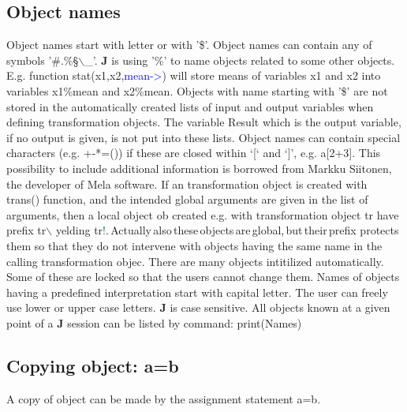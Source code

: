 \subsection{Object names}
\label{onames}
Object names start with letter or with '\$'. Object names can contain any of
symbols '\#.\%§$\backslash$\_'. \textbf{J} is using '\%' to name objects related to some other objects.
E.g. function \textcolor{VioletRed}{stat}(x1,x2,\textcolor{blue}{mean->}) will store means of variables x1 and x2 into
variables x1\%mean and x2\%mean. Objects with name starting with '\$' are not
stored in the automatically created lists of input and output variables when
defining transformation objects. The variable Result which
is the output variable, if no output is given, is not put into these lists.
Object names can contain special characters (e.g. +-*=()) if these are closed
within ‘[‘ and ‘]’, e.g. a[2+3]. This possibility to include additional information
is borrowed from Markku Siitonen, the developer of Mela software.
If an transformation object is created with \textcolor{VioletRed}{trans}() function, and the
intended global arguments are given in the list of arguments,
then a  local object {ob} created e.g. with transformation object {tr} have prefix
{tr$\backslash$} yelding {tr\textcolor{green}{!\ob}.\,Actually\,also\,these\,objects\,are\,global,\,but\,their\,prefix}
protects them so that they do not intervene with objects having the same name in the
calling transformation objec.
There are many objects intitilized automatically.
Some of these are locked so that the users cannot change them.
Names of objects having a predefined interpretation start with capital letter.
The user can freely use lower or upper case letters. \textbf{J} is case sensitive.
All objects known at a given point of a \textbf{J} session can be listed by command:
\textcolor{VioletRed}{print}(Names)
\subsection{Copying object: a=b}
\label{copy}
A copy of object can be made by the assignment statement a=b.
